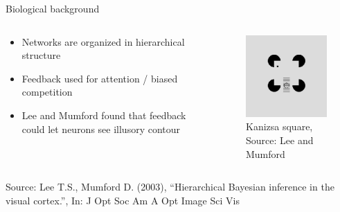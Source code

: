 \documentclass[aspectratio=169]{beamer}
\begin{document}
\begin{frame}{Biological background}
  \begin{columns}[onlytextwidth]
	\begin{column}{0.7\textwidth}
	\vspace{-1.0cm}
      \begin{itemize}
        \item Networks are organized in hierarchical structure
        \item Feedback used for attention / biased competition
        \item Lee and Mumford found that feedback could let neurons see illusory contour
   \end{itemize}
	\end{column}
	\begin{column}{0.3\textwidth}
      \begin{figure}
        \includegraphics[width=0.6\linewidth]{../Latex/figures/kanizsaSquare.PNG}
      \\   \footnotesize Kanizsa square, Source: Lee and Mumford
      \end{figure} 
  	\end{column}
  \end{columns}
  \scriptsize Source: Lee T.S., Mumford D. (2003), “Hierarchical Bayesian inference in the
 visual cortex.”, In: J Opt Soc Am A Opt Image Sci Vis
\end{frame}
\end{document}
